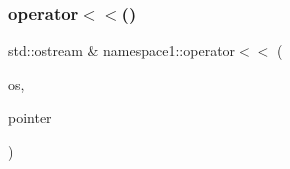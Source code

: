 \mbox{\label{namespacenamespace1_a9be9cab39b3a33a012040d70e1c86949}} 
\subsubsection{\texorpdfstring{operator$<$$<$()}{operator<<()}\hspace{0.1cm}{\footnotesize\ttfamily [2/2]}}
{\footnotesize\ttfamily std\+::ostream \& namespace1\+::operator$<$$<$ (\begin{DoxyParamCaption}\item[{std\+::ostream \&}]{os,  }\item[{const \mbox{\hyperlink{classnamespace1_1_1_my_type_in_name_space1}{My\+Type\+In\+Name\+Space1}} $\ast$}]{pointer }\end{DoxyParamCaption})}

